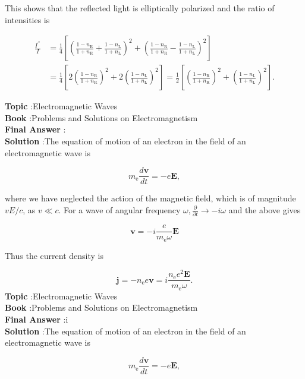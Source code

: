 \documentclass[10pt]{article}
\begin{document}
This shows that the reflected light is elliptically polarized and the ratio of intensities is

$$
\begin{aligned}
\frac{I^{\prime \prime}}{I} &=\frac{1}{4}\left[\left(\frac{1-n_{\mathrm{R}}}{1+n_{\mathrm{R}}}+\frac{1-n_{\mathrm{L}}}{1+n_{\mathrm{L}}}\right)^{2}+\left(\frac{1-n_{\mathrm{R}}}{1+n_{\mathrm{R}}}-\frac{1-n_{\mathrm{L}}}{1+n_{\mathrm{L}}}\right)^{2}\right] \\
&=\frac{1}{4}\left[2\left(\frac{1-n_{\mathrm{R}}}{1+n_{\mathrm{R}}}\right)^{2}+2\left(\frac{1-n_{\mathrm{L}}}{1+n_{\mathrm{L}}}\right)^{2}\right]=\frac{1}{2}\left[\left(\frac{1-n_{\mathrm{R}}}{1+n_{\mathrm{R}}}\right)^{2}+\left(\frac{1-n_{\mathrm{L}}}{1+n_{\mathrm{L}}}\right)^{2}\right] .
\end{aligned}
$$


\textbf{Topic} :Electromagnetic Waves\\
\textbf{Book} :Problems and Solutions on Electromagnetism\\
\textbf{Final Answer} :\\


\textbf{Solution} :The equation of motion of an electron in the field of an electromagnetic wave is

$$
m_{\mathrm{e}} \frac{d \mathbf{v}}{d t}=-e \mathbf{E},
$$

where we have neglected the action of the magnetic field, which is of magnitude $v E / c$, as $v \ll c$. For a wave of angular frequency $\omega, \frac{\partial}{\partial t} \rightarrow-i \omega$ and the above gives

$$
\mathbf{v}=-i \frac{e}{m_{\mathrm{e}} \omega} \mathbf{E}
$$

Thus the current density is

$$
\mathbf{j}=-n_{\mathrm{e}} e \mathbf{v}=i \frac{n_{\mathrm{e}} e^{2} \mathbf{E}}{m_{\mathrm{e}} \omega} .
$$
\textbf{Topic} :Electromagnetic Waves\\
\textbf{Book} :Problems and Solutions on Electromagnetism\\
\textbf{Final Answer} :i \\


\textbf{Solution} :The equation of motion of an electron in the field of an electromagnetic wave is

$$
m_{\mathrm{e}} \frac{d \mathbf{v}}{d t}=-e \mathbf{E},
$$
\end{document}

